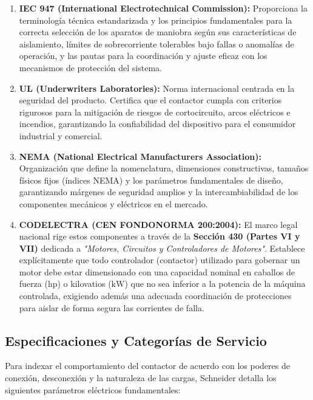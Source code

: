 \begin{enumerate}
    
    \item\textbf{ IEC 947 (International Electrotechnical Commission):}
    Proporciona la terminología técnica estandarizada y los principios fundamentales para la correcta selección de los aparatos de maniobra según sus características de aislamiento, límites de sobrecorriente tolerables bajo fallas o anomalías de operación, y las pautas para la coordinación y ajuste eficaz con los mecanismos de protección del sistema.
    
    \item\textbf{UL (Underwriters Laboratories):}
    Norma internacional centrada en la seguridad del producto. Certifica que el contactor cumpla con criterios rigurosos para la mitigación de riesgos de cortocircuito, arcos eléctricos e incendios, garantizando la confiabilidad del dispositivo para el consumidor industrial y comercial.
    
    \item\textbf{NEMA (National Electrical Manufacturers Association):}
    Organización que define la nomenclatura, dimensiones constructivas, tamaños físicos fijos (índices NEMA) y los parámetros fundamentales de diseño, garantizando márgenes de seguridad amplios y la intercambiabilidad de los componentes mecánicos y eléctricos en el mercado.
    
    \item\textbf{CODELECTRA (CEN FONDONORMA 200:2004):}
    El marco legal nacional rige estos componentes a través de la \textbf{Sección 430 (Partes VI y VII)} dedicada a \textit{"Motores, Circuitos y Controladores de Motores"}. Establece explícitamente que todo controlador (contactor) utilizado para gobernar un motor debe estar dimensionado con una capacidad nominal en caballos de fuerza ($\text{hp}$) o kilovatios ($\text{kW}$) que no sea inferior a la potencia de la máquina controlada, exigiendo además una adecuada coordinación de protecciones para aislar de forma segura las corrientes de falla.
    
\end{enumerate}


\subsection{Especificaciones y Categorías de Servicio}

Para indexar el comportamiento del contactor de acuerdo con los poderes de conexión, desconexión y la naturaleza de las cargas, Schneider detalla los siguientes parámetros eléctricos fundamentales:

